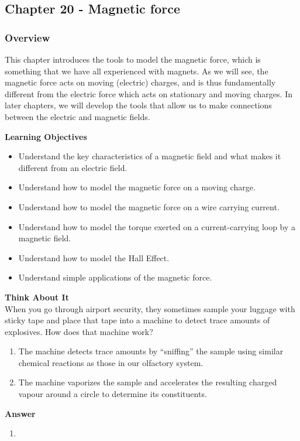 \subsection{Chapter 20 - Magnetic force}

\subsubsection{Overview}\label{chapter:magneticforce}

This chapter introduces the tools to model the magnetic force, which is something that we have all experienced with magnets. As we will see, the magnetic force acts on moving (electric) charges, and is thus fundamentally different from the electric force which acts on stationary and moving charges. In later chapters, we will develop the tools that allow us to make connections between the electric and magnetic fields.

\begin{framed}
\textbf{Learning Objectives}\\
\begin{itemize}
\item Understand the key characteristics of a magnetic field and what makes it different from an electric field.
\item Understand how to model the magnetic force on a moving charge.
\item Understand how to model the magnetic force on a wire carrying current.
\item Understand how to model the torque exerted on a current-carrying loop by a magnetic field.
\item Understand how to model the Hall Effect.
\item Understand simple applications of the magnetic force.
\end{itemize}
\end{framed}

\begin{framed}
\textbf{Think About It}\\
When you go through airport security, they sometimes sample your luggage with sticky tape and place that tape into a machine to detect trace amounts of explosives. How does that machine work?

\begin{enumerate}
\item The machine detects trace amounts by ``sniffing'' the sample using similar chemical reactions as those in our olfactory system.
\item The machine vaporizes the sample and accelerates the resulting charged vapour around a circle to determine its constituents.
\end{enumerate}

\begin{framed}
\textbf{Answer}\\
\begin{enumerate}[resume]
\item
\end{enumerate}
\end{framed}
\end{framed}

